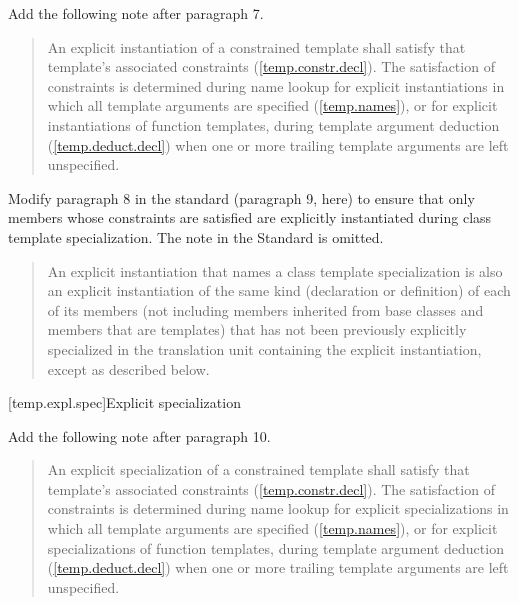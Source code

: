 Add the following note after paragraph 7.

\begin{quote}
\setcounter{Paras}{7}
\begin{addedblock}
\pnum
\enternote
An explicit instantiation of a constrained template shall satisfy that
template's associated constraints (\ref{temp.constr.decl}). The satisfaction
of constraints is determined during name lookup for explicit instantiations
in which all template arguments are specified (\ref{temp.names}), or for
explicit instantiations of function templates, during template argument 
deduction (\ref{temp.deduct.decl}) when one or more trailing template 
arguments are left unspecified.
\exitnote
\end{addedblock}
\end{quote}

Modify paragraph 8 in the \Cpp standard (paragraph 9, here) to ensure that 
only members whose constraints are satisfied are explicitly instantiated 
during class template specialization. The note in the \Cpp Standard is omitted.

\begin{quote}
\setcounter{Paras}{8}
\pnum
An explicit instantiation that names a class template specialization is 
also an explicit instantiation of the same kind (declaration or 
definition) of each of its members (not including members inherited from 
base classes and members that are templates) that has not been previously 
explicitly specialized in the translation unit containing the explicit 
instantiation, 
except as described below.
\end{quote}

[temp.expl.spec]{Explicit specialization}

Add the following note after paragraph 10.

\begin{quote}
\setcounter{Paras}{10}
\begin{addedblock}
\pnum
\enternote
An explicit specialization of a constrained template shall satisfy that
template's associated constraints (\ref{temp.constr.decl}). The satisfaction
of constraints is determined during name lookup for explicit specializations
in which all template arguments are specified (\ref{temp.names}), or for
explicit specializations of function templates, during template argument 
deduction (\ref{temp.deduct.decl}) when one or more trailing template 
arguments are left unspecified.
\exitnote
\end{addedblock}
\end{quote}


